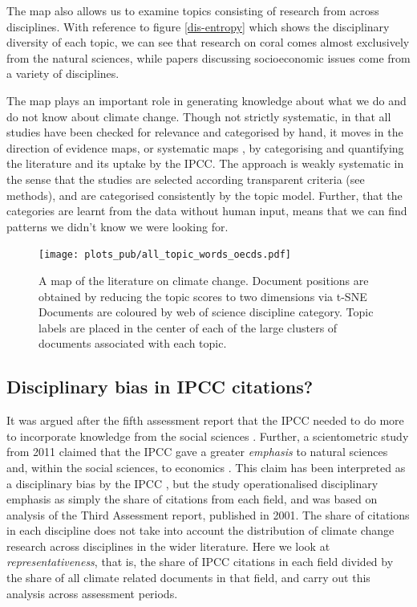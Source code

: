\documentclass{article}
\begin{document}
\begin{linenumbers}

The map also allows us to examine topics consisting of research from across disciplines. With reference to figure \ref{dis-entropy} which shows the disciplinary diversity of each topic, we can see that research on coral comes almost exclusively from the natural sciences, while papers discussing socioeconomic issues come from a variety of disciplines. 

The map plays an important role in generating knowledge about what we do and do not know about climate change. Though not strictly systematic, in that all studies have been checked for relevance and categorised by hand, it moves in the direction of evidence maps, or systematic maps \cite{McKinnon2015, James2016}, by categorising and quantifying the literature and its uptake by the IPCC. The approach is weakly systematic in the sense that the studies are selected according transparent criteria (see methods), and are categorised consistently by the topic model. Further, that the categories are learnt from the data without human input, means that we can find patterns we didn't know we were looking for. 


\begin{figure}[htp]
	\begin{center}
		\texttt{[image: plots\_pub/all\_topic\_words\_oecds.pdf]}
		\caption{A map of the literature on climate change. Document positions are obtained by reducing the topic scores to two dimensions via t-SNE Documents are coloured by web of science discipline category. Topic labels are placed in the center of each of the large clusters of documents associated with each topic. }
		\label{oecd_topic_map}
	\end{center}
\end{figure}

\subsection*{Disciplinary bias in IPCC citations?}

It was argued after the fifth assessment report that the IPCC needed to do more to incorporate knowledge from the social sciences \cite{Victor2015}. Further, a scientometric study from 2011 claimed that the IPCC gave a greater \textit{emphasis} to natural sciences and, within the social sciences, to economics \cite{Bjurström2011}. This claim has been interpreted as a disciplinary bias by the IPCC \cite{Hulme2010, Corbera2016}, but the study operationalised disciplinary emphasis as simply the share of citations from each field, and was based on analysis of the Third Assessment report, published in 2001. The share of citations in each discipline does not take into account the distribution of climate change research across disciplines in the wider literature. Here we look at \textit{representativeness}, that is, the share of IPCC citations in each field divided by the share of all climate related documents in that field, and carry out this analysis across assessment periods.


\end{linenumbers}
\end{document}
